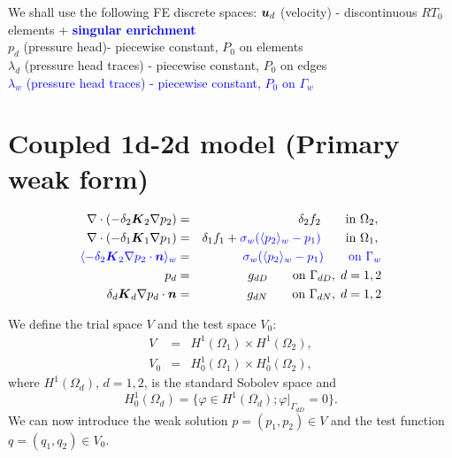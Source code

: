 We shall use the following FE discrete spaces:
$\mathbf{\boldsymbol{u}}_d$ (velocity) - discontinuous $RT_0$ elements + \textcolor{blue}{\bf singular enrichment}\\
$p_d$ (pressure head)- piecewise constant, $P_0$ on elements \\
$\lambda_d$ (pressure head traces) - piecewise constant, $P_0$ on edges \\
\textcolor{blue}{$\lambda_w$ (pressure head traces) - piecewise constant, $P_0$ on $\Gamma_w$}



\section{Coupled 1d-2d model (Primary weak form)}

\begin{eqnarray}
\nabla \cdot \left( -\delta_2 \mathbf{\boldsymbol{K}}_2 \nabla p_2 \right) &=& \delta_2 f_2 \qquad \textrm{in } \Omega_2,\;  \\
\nabla \cdot \left( -\delta_1 \mathbf{\boldsymbol{K}}_1 \nabla p_1 \right) &=& \delta_1 f_1 + {\color{blue}\sigma_w(\langle p_2\rangle_w-p_1)} \qquad \textrm{in } \Omega_1,\;  \\
\color{blue}\langle-\delta_2 \mathbf{\boldsymbol{K}}_2 \nabla p_2 \cdot \mathbf{\boldsymbol{n}}\rangle_w &=& \color{blue}\sigma_w (\langle p_2\rangle_w - p_{1}) \qquad \textrm{on } \Gamma_w\\
p_d &=& g_{dD} \qquad \textrm{on } \Gamma_{dD},\; d=1,2 \\
\delta_d \mathbf{\boldsymbol{K}}_d \nabla p_d \cdot \mathbf{\boldsymbol{n}} &=& g_{dN} \qquad \textrm{on } \Gamma_{dN},\; d=1,2
  \end{eqnarray}


We define the trial space $V$ and the test space $V_0$:
\begin{eqnarray} \label{eqn:spaces}
  V &=& H^1(\Omega_1)\times H^1(\Omega_2), \\
  V_0 &=& H^1_0(\Omega_1)\times H^1_0(\Omega_2),
\end{eqnarray}
where $H^1(\Omega_d)$, $d=1,2$, is the standard Sobolev space and 
\[ H^1_0(\Omega_d)=\{\varphi\in H^1(\Omega_d); \varphi|_{\Gamma_{dD}}=0\}. \]
We can now introduce the weak solution $p=(p_1,p_2)\in V$ and the test function $q=(q_1,q_2)\in V_0$.

